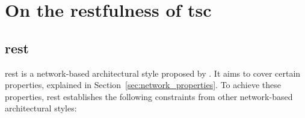 
\section{On the \acs{rest}fulness of \acs{tsc}}
\label{sec:tsc_restfulness}

\subsection{\acl{rest}}
\label{sec:rest}

\acf{rest} is a network-based architectural style proposed by \citet{fielding_architectural_2000}.
It aims to cover certain properties, explained in Section~\ref{sec:network_properties}.
To achieve these properties, \ac{rest} establishes the following constraints from other network-based architectural styles:
